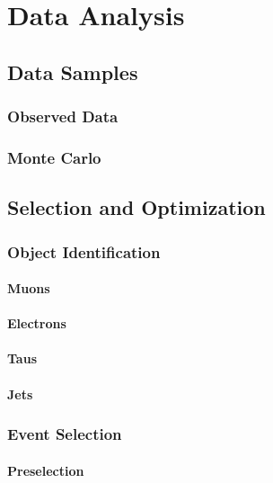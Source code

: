 \chapter{Data Analysis
\label{ch:analysis}}

\section{Data Samples}

\subsection{Observed Data}

\subsection{Monte Carlo}

\section{Selection and Optimization}

\subsection{Object Identification}

\subsubsection{Muons}

\subsubsection{Electrons}

\subsubsection{Taus}

\subsubsection{Jets}

\subsection{Event Selection}

\subsubsection{Preselection}

